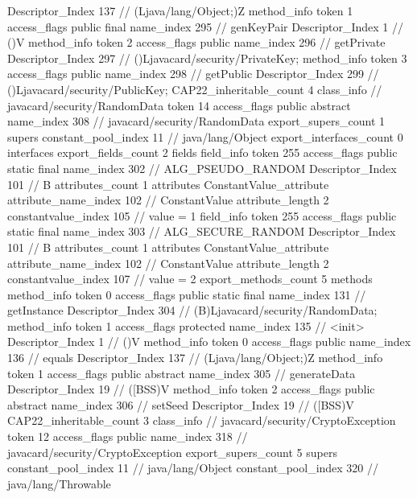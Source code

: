 {{{{{					Descriptor_Index	137		// (Ljava/lang/Object;)Z
				}
				method_info {
					token	1
					access_flags	public final
					name_index	295		// genKeyPair
					Descriptor_Index	1		// ()V
				}
				method_info {
					token	2
					access_flags	public
					name_index	296		// getPrivate
					Descriptor_Index	297		// ()Ljavacard/security/PrivateKey;
				}
				method_info {
					token	3
					access_flags	public
					name_index	298		// getPublic
					Descriptor_Index	299		// ()Ljavacard/security/PublicKey;
				}
			}
			CAP22_inheritable_count	4
		}
		class_info {		// javacard/security/RandomData
			token	14
			access_flags	public abstract
			name_index	308		// javacard/security/RandomData
			export_supers_count	1
			supers {
				constant_pool_index	11		// java/lang/Object
			}
			export_interfaces_count	0
			interfaces {
			}
			export_fields_count	2
			fields {
			field_info {
				token	255
				access_flags	public static final
				name_index	302		// ALG_PSEUDO_RANDOM
				Descriptor_Index	101		// B
				attributes_count	1
				attributes {
				ConstantValue_attribute {
					attribute_name_index	102		// ConstantValue
					attribute_length	2
					constantvalue_index	105		// value = 1
				}
				}
			}
			field_info {
				token	255
				access_flags	public static final
				name_index	303		// ALG_SECURE_RANDOM
				Descriptor_Index	101		// B
				attributes_count	1
				attributes {
				ConstantValue_attribute {
					attribute_name_index	102		// ConstantValue
					attribute_length	2
					constantvalue_index	107		// value = 2
				}
				}
			}
			}
			export_methods_count	5
			methods {
				method_info {
					token	0
					access_flags	public static final
					name_index	131		// getInstance
					Descriptor_Index	304		// (B)Ljavacard/security/RandomData;
				}
				method_info {
					token	1
					access_flags	protected
					name_index	135		// <init>
					Descriptor_Index	1		// ()V
				}
				method_info {
					token	0
					access_flags	public
					name_index	136		// equals
					Descriptor_Index	137		// (Ljava/lang/Object;)Z
				}
				method_info {
					token	1
					access_flags	public abstract
					name_index	305		// generateData
					Descriptor_Index	19		// ([BSS)V
				}
				method_info {
					token	2
					access_flags	public abstract
					name_index	306		// setSeed
					Descriptor_Index	19		// ([BSS)V
				}
			}
			CAP22_inheritable_count	3
		}
		class_info {		// javacard/security/CryptoException
			token	12
			access_flags	public
			name_index	318		// javacard/security/CryptoException
			export_supers_count	5
			supers {
				constant_pool_index	11		// java/lang/Object
				constant_pool_index	320		// java/lang/Throwable
}}}}
